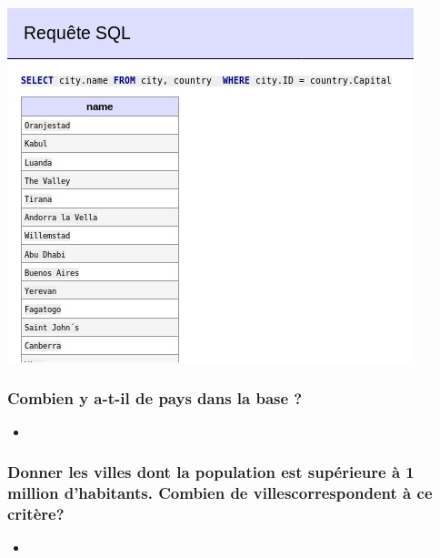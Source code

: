 \documentclass[a4paper,10pt]{article}
\newcommand{\insertcode}[2]{\begin{itemize}\item[]\end{itemize}}
\begin{document}
\includegraphics[scale=0.8]{ressource/3.jpg}

\newpage


\subsubsection{Combien y a-t-il de pays dans la base ? }
\insertcode{commande/5.txt}{count() }
\subsubsection{Donner les villes dont la population est supérieure à 1 million d’habitants. Combien de villescorrespondent à ce critère?}

\insertcode{commande/6.txt}{}
\end{document}
